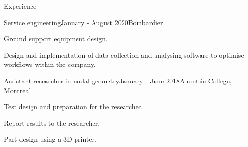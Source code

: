 \documentclass{resume} %
\begin{document}
	
	
	\begin{rSection}{Experience}
		
		\begin{rSubsection}{Service engineering}{January - August 2020}{Bombardier}{}{}
			\item Ground support equipment design.
			\item Design and implementation of data collection and analysing software to optimise workflows within the company.
		\end{rSubsection}
		
		\begin{rSubsection}{Assistant researcher in nodal geometry}{January - June 2018}{Ahuntsic College, Montreal}{}
			\item   Test design and preparation for the researcher.
			\item   Report results to the researcher.
			\item   Part design using a 3D printer.
		\end{rSubsection}
		
		
	\end{rSection}
	
	
	\iffalse
	\begin{rSection}{Accomplissements académiques} 
		\begin{rSubsection}{Collège Ahuntsic, Montréal}{2018}{Bourse d'implication scientifique}
			 
		\end{rSubsection}
		\begin{rSubsection}{Polytechnique Montréal}{2018}{Bourse d'excellence à l'admission}
			  
		\end{rSubsection}
		
	\end{rSection}
	\fi
	
\end{document}
